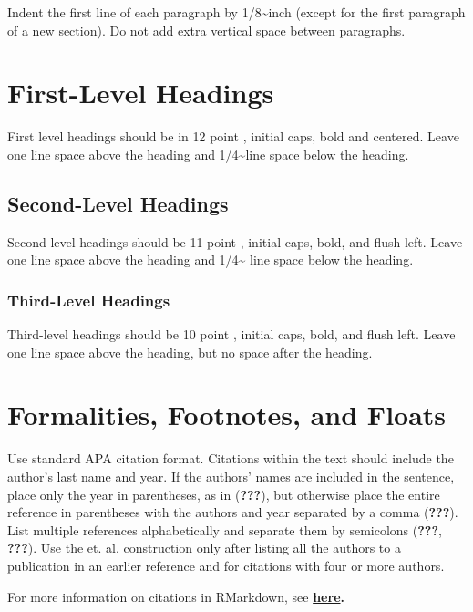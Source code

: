 \documentclass[10pt, letterpaper]{article}
\begin{document}
Indent the first line of each paragraph by 1/8\textasciitilde{}inch
(except for the first paragraph of a new section). Do not add extra
vertical space between paragraphs.

\section{First-Level Headings}\label{first-level-headings}

First level headings should be in 12 point , initial caps, bold and
centered. Leave one line space above the heading and
1/4\textasciitilde{}line space below the heading.

\subsection{Second-Level Headings}\label{second-level-headings}

Second level headings should be 11 point , initial caps, bold, and flush
left. Leave one line space above the heading and 1/4\textasciitilde{}
line space below the heading.

\subsubsection{Third-Level Headings}\label{third-level-headings}

Third-level headings should be 10 point , initial caps, bold, and flush
left. Leave one line space above the heading, but no space after the
heading.

\section{Formalities, Footnotes, and
Floats}\label{formalities-footnotes-and-floats}

Use standard APA citation format. Citations within the text should
include the author's last name and year. If the authors' names are
included in the sentence, place only the year in parentheses, as in
({\textbf{???}}), but otherwise place the entire reference in
parentheses with the authors and year separated by a comma
({\textbf{???}}). List multiple references alphabetically and separate
them by semicolons ({\textbf{???}}, {\textbf{???}}). Use the et. al.
construction only after listing all the authors to a publication in an
earlier reference and for citations with four or more authors.

For more information on citations in RMarkdown, see
\textbf{\href{http://rmarkdown.rstudio.com/authoring_bibliographies_and_citations.html\#citations}{here}.}
\end{document}
